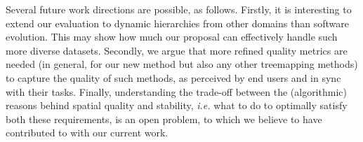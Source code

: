 Several future work directions are possible, as follows. Firstly, it is interesting to extend our evaluation to dynamic hierarchies from other domains than software evolution. This may show how much our proposal can effectively handle such more diverse datasets. Secondly, we argue that more refined quality metrics are needed (in general, for our new method but also any other treemapping methods) to capture the quality of such methods, as perceived by end users and in sync with their tasks. Finally, understanding the trade-off between the (algorithmic) reasons behind spatial quality and stability, \emph{i.e.} what to do to optimally satisfy both these requirements, is an open problem, to which we believe to have contributed to with our current work.

\newpage
